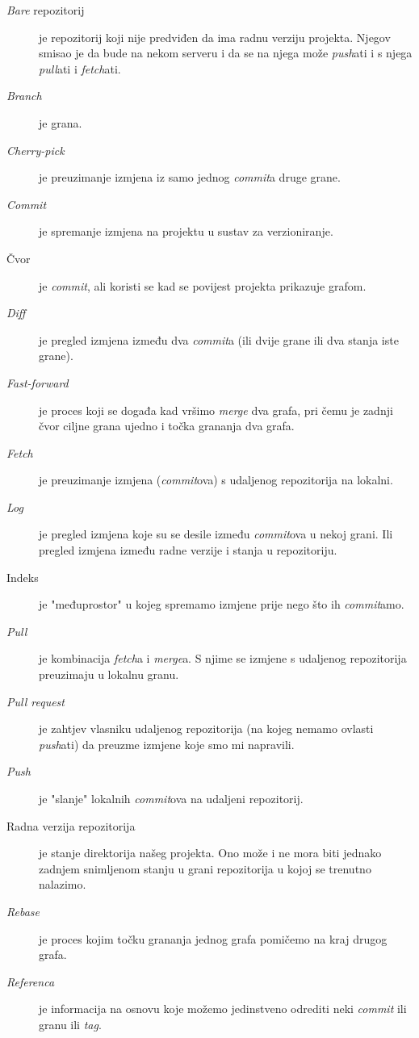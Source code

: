 \begin{description}
    \item[\emph{Bare} repozitorij] je repozitorij koji nije predviđen da ima radnu verziju projekta. Njegov smisao je da bude na nekom serveru i da se na njega može \emph{push}ati i s njega \emph{pull}ati i \emph{fetch}ati.
    \item[\emph{Branch}] je grana.
    \item[\emph{Cherry-pick}] je preuzimanje izmjena iz samo jednog \emph{commit}a druge grane.
    \item[\emph{Commit}] je spremanje izmjena na projektu u sustav za verzioniranje.
    \item[Čvor] je \emph{commit}, ali koristi se kad se povijest projekta prikazuje grafom.
    \item[\emph{Diff}] je pregled izmjena između dva \emph{commit}a (ili dvije grane ili dva stanja iste grane).
    \item[\emph{Fast-forward}] je proces koji se događa kad vršimo \emph{merge} dva grafa, pri čemu je zadnji čvor ciljne grana ujedno i točka grananja dva grafa.
    \item[\emph{Fetch}] je preuzimanje izmjena (\emph{commit}ova) s udaljenog repozitorija na lokalni.
    \item[\emph{Log}] je pregled izmjena koje su se desile između \emph{commit}ova u nekoj grani. Ili pregled izmjena između radne verzije i stanja u repozitoriju.
    \item[Indeks] je "međuprostor" u kojeg spremamo izmjene prije nego što ih \emph{commit}amo.
    \item[\emph{Pull}] je kombinacija \emph{fetch}a i \emph{merge}a. S njime se izmjene s udaljenog repozitorija preuzimaju u lokalnu granu.
    \item[\emph{Pull request}] je zahtjev vlasniku udaljenog repozitorija (na kojeg nemamo ovlasti \emph{push}ati) da preuzme izmjene koje smo mi napravili.
    \item[\emph{Push}] je "slanje" lokalnih \emph{commit}ova na udaljeni repozitorij.
    \item[Radna verzija repozitorija] je stanje direktorija našeg projekta. Ono može i ne mora biti jednako zadnjem snimljenom stanju u grani repozitorija u kojoj se trenutno nalazimo.
    \item[\emph{Rebase}] je proces kojim točku grananja jednog grafa pomičemo na kraj drugog grafa.
    \item[\emph{Referenca}] je informacija na osnovu koje možemo jedinstveno odrediti neki \emph{commit} ili granu ili \emph{tag}.

\end{description}
